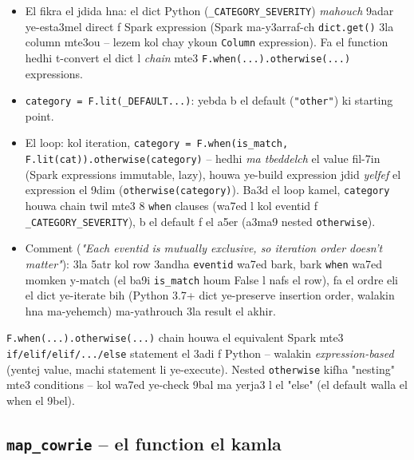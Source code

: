 \documentclass[11pt,a4paper]{report}
\DeclareRobustCommand{\code}[1]{\texttt{#1}}
\begin{document}
\begin{itemize}
  \item El fikra el jdida hna: el dict Python (\code{\_CATEGORY\_SEVERITY})
        \emph{mahouch} 9adar ye-esta3mel direct f Spark expression (Spark
        ma-y3arraf-ch \code{dict.get()} 3la column mte3ou -- lezem kol
        chay ykoun \code{Column} expression). Fa el function hedhi
        t-convert el dict l \emph{chain} mte3 \code{F.when(...).otherwise(...)}
        expressions.
  \item \code{category = F.lit(\_DEFAULT...)}: yebda b el default (\code{"other"})
        ki starting point.
  \item El loop: kol iteration, \code{category = F.when(is\_match, F.lit(cat)).otherwise(category)}
        -- hedhi \emph{ma tbeddelch} el value fil-7in (Spark expressions
        immutable, lazy), houwa ye-build expression jdid \emph{yelfef}
        el expression el 9dim (\code{otherwise(category)}). Ba3d el loop
        kamel, \code{category} houwa chain twil mte3 8 \code{when} clauses
        (wa7ed l kol eventid f \code{\_CATEGORY\_SEVERITY}), b el default
        f el a5er (a3ma9 nested \code{otherwise}).
  \item Comment (\emph{"Each eventid is mutually exclusive, so iteration
        order doesn't matter"}): 3la 5atr kol row 3andha \code{eventid}
        wa7ed bark, bark \code{when} wa7ed momken y-match (el ba9i
        \code{is\_match} houm False l nafs el row), fa el ordre eli el
        dict ye-iterate bih (Python 3.7+ dict ye-preserve insertion order,
        walakin hna ma-yehemch) ma-yathrouch 3la result el akhir.
\end{itemize}

\begin{analogy}
\code{F.when(...).otherwise(...)} chain houwa el equivalent Spark mte3
\code{if/elif/elif/.../else} statement el 3adi f Python -- walakin
\emph{expression-based} (yentej value, machi statement li ye-execute).
Nested \code{otherwise} kifha "nesting" mte3 conditions -- kol wa7ed
ye-check 9bal ma yerja3 l el "else" (el default walla el when el 9bel).
\end{analogy}

\subsection{\code{map\_cowrie} -- el function el kamla}
\end{document}
